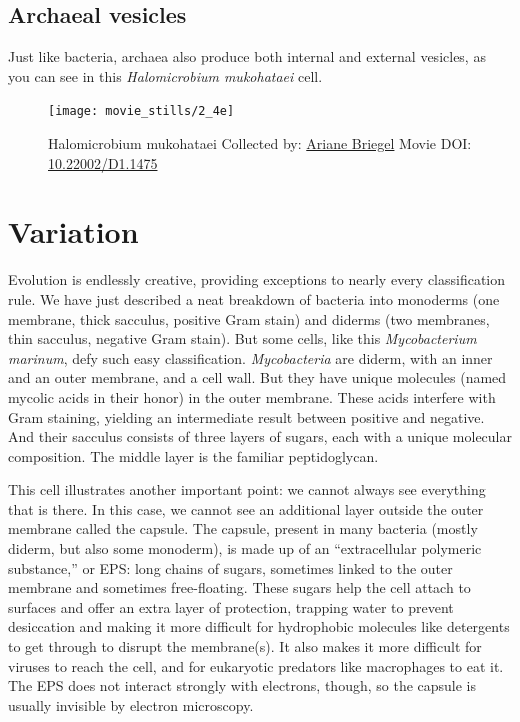 \documentclass[]{tufte-book}
\begin{document}
\hypertarget{Archaeal_vesicles}{\subsection{Archaeal
vesicles}\label{Archaeal_vesicles}}

Just like bacteria, archaea also produce both internal and external
vesicles, as you can see in this \emph{Halomicrobium mukohataei} cell.





\begin{figure}
\texttt{[image: movie\_stills/2\_4e]} \caption[Halomicrobium mukohataei Collected by:
\protect\hyperlink{ariane_briegel}{Ariane Briegel} Movie DOI:
\href{https://doi.org/10.22002/D1.1475}{10.22002/D1.1475}]{Halomicrobium mukohataei Collected by:
\protect\hyperlink{ariane_briegel}{Ariane Briegel} Movie DOI:
\href{https://doi.org/10.22002/D1.1475}{10.22002/D1.1475}}\label{fig:2-4e}
\end{figure}

\section{Variation}\label{variation}

Evolution is endlessly creative, providing exceptions to nearly every
classification rule. We have just described a neat breakdown of bacteria
into monoderms (one membrane, thick sacculus, positive Gram stain) and
diderms (two membranes, thin sacculus, negative Gram stain). But some
cells, like this \emph{Mycobacterium marinum}, defy such easy
classification. \emph{Mycobacteria} are diderm, with an inner and an
outer membrane, and a cell wall. But they have unique molecules (named
mycolic acids in their honor) in the outer membrane. These acids
interfere with Gram staining, yielding an intermediate result between
positive and negative. And their sacculus consists of three layers of
sugars, each with a unique molecular composition. The middle layer is
the familiar peptidoglycan.

This cell illustrates another important point: we cannot always see
everything that is there. In this case, we cannot see an additional
layer outside the outer membrane called the capsule. The capsule,
present in many bacteria (mostly diderm, but also some monoderm), is
made up of an ``extracellular polymeric substance,'' or EPS: long chains
of sugars, sometimes linked to the outer membrane and sometimes
free-floating. These sugars help the cell attach to surfaces and offer
an extra layer of protection, trapping water to prevent desiccation and
making it more difficult for hydrophobic molecules like detergents to
get through to disrupt the membrane(s). It also makes it more difficult
for viruses to reach the cell, and for eukaryotic predators like
macrophages to eat it. The EPS does not interact strongly with
electrons, though, so the capsule is usually invisible by electron
microscopy.
\end{document}
